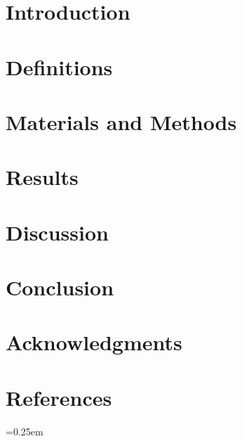 \documentclass[a4paper, 12pt]{article}
\begin{document}


\newpage
\tableofcontents

\newpage
\section{Introduction}



\newpage
\section{Definitions}



\newpage
\section{Materials and Methods}



\newpage
\section{Results}



\newpage
\section{Discussion}



\newpage
\section{Conclusion}



\newpage
\section{Acknowledgments}



\newpage
\section{References}

\emergencystretch=0.25em
\printbibliography[heading=none]

\newpage
\end{document}
